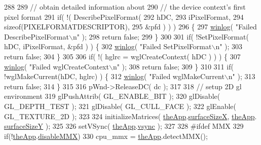 \begin{DoxyCode}
{288     
289     \textcolor{comment}{// obtain detailed information about}
290     \textcolor{comment}{// the device context's first pixel format}
291     \textcolor{keywordflow}{if}( !( DescribePixelFormat(
292         hDC,
293         iPixelFormat,
294         \textcolor{keyword}{sizeof}(PIXELFORMATDESCRIPTOR),
295         &pfd ) ) )
296     \{
297         \mbox{\hyperlink{_open_g_l_8cpp_aceca31284db939464c9dc0fb15c92786}{winlog}}( \textcolor{stringliteral}{"Failed DescribePixelFormat\(\backslash\)n"} );
298         \textcolor{keywordflow}{return} \textcolor{keyword}{false};
299     \}
300     
301     \textcolor{keywordflow}{if}( !SetPixelFormat( hDC, iPixelFormat, &pfd ) ) \{
302         \mbox{\hyperlink{_open_g_l_8cpp_aceca31284db939464c9dc0fb15c92786}{winlog}}( \textcolor{stringliteral}{"Failed SetPixelFormat\(\backslash\)n"} );
303         \textcolor{keywordflow}{return} \textcolor{keyword}{false};
304     \}
305     
306     \textcolor{keywordflow}{if}( !( hglrc = wglCreateContext( hDC ) ) ) \{
307         \mbox{\hyperlink{_open_g_l_8cpp_aceca31284db939464c9dc0fb15c92786}{winlog}}( \textcolor{stringliteral}{"Failed wglCreateContext\(\backslash\)n"} );
308         \textcolor{keywordflow}{return} \textcolor{keyword}{false};
309     \}
310     
311     \textcolor{keywordflow}{if}( !wglMakeCurrent(hDC, hglrc) ) \{
312         \mbox{\hyperlink{_open_g_l_8cpp_aceca31284db939464c9dc0fb15c92786}{winlog}}( \textcolor{stringliteral}{"Failed wglMakeCurrent\(\backslash\)n"} );
313         \textcolor{keywordflow}{return} \textcolor{keyword}{false};
314     \}
315     
316     pWnd->ReleaseDC( dc );
317     
318     \textcolor{comment}{// setup 2D gl environment}
319     glPushAttrib( GL\_ENABLE\_BIT );
320     glDisable( GL\_DEPTH\_TEST );
321     glDisable( GL\_CULL\_FACE );
322     glEnable( GL\_TEXTURE\_2D );
323 
324     initializeMatrices( \mbox{\hyperlink{_v_b_a_8cpp_a8095a9d06b37a7efe3723f3218ad8fb3}{theApp}}.\mbox{\hyperlink{class_v_b_a_a14ab3c3ab83f07d70e2a40090e37deea}{surfaceSizeX}}, \mbox{\hyperlink{_v_b_a_8cpp_a8095a9d06b37a7efe3723f3218ad8fb3}{theApp}}.
      \mbox{\hyperlink{class_v_b_a_a63dc67ff3aa9347f32f583fee92cf609}{surfaceSizeY}} );
325 
326     setVSync( \mbox{\hyperlink{_v_b_a_8cpp_a8095a9d06b37a7efe3723f3218ad8fb3}{theApp}}.\mbox{\hyperlink{class_v_b_a_a84075b77df64f3dc2100159064b79fba}{vsync}} );
327 
328 \textcolor{preprocessor}{#ifdef MMX}
329     \textcolor{keywordflow}{if}(!\mbox{\hyperlink{_v_b_a_8cpp_a8095a9d06b37a7efe3723f3218ad8fb3}{theApp}}.\mbox{\hyperlink{class_v_b_a_ac417f46c467d0fcf095731620ca7de71}{disableMMX}})
330         cpu\_mmx = \mbox{\hyperlink{_v_b_a_8cpp_a8095a9d06b37a7efe3723f3218ad8fb3}{theApp}}.detectMMX();
}
\end{DoxyCode}
